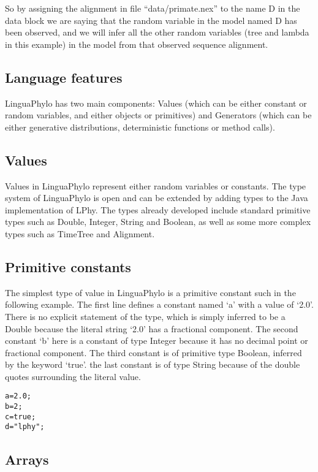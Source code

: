 \documentclass[10pt,letterpaper,table]{article}
\begin{document}
So by assigning the alignment in file
``data/primate.nex'' to the name D in the data block we are saying that the random variable in the model named D has
been observed, and we will infer all the other random variables
(tree and lambda in this example) in the model from that observed sequence alignment.

\subsection*{Language features}

LinguaPhylo has two main components: Values (which can be either constant or random variables, and either objects or primitives) and Generators (which can be either generative distributions, deterministic functions or method calls).

\subsection*{Values}

Values in LinguaPhylo represent either random variables or constants. The type system of LinguaPhylo is open and can be extended by adding types to the Java implementation of LPhy. The types already developed include standard primitive types such as Double, Integer, String and Boolean, as well as some more complex types such as TimeTree and Alignment.

\subsection*{Primitive constants}

The simplest type of value in LinguaPhylo is a primitive constant such in the following example. The first line defines a constant named `a' with a value of `2.0'. There is no explicit statement of the type, which is simply inferred to be a Double because the literal string `2.0' has a fractional component. The second constant `b' here is a constant of type Integer because it has no decimal point or fractional component. The third constant is of primitive type Boolean, inferred by the keyword `true'. the last constant is of type String because of the double quotes surrounding the literal value.

{\singlespacing
\begin{alltt}
  a = 2.0;
  b = 2;
  c = true;
  d = "lphy";
\end{alltt}
}

\subsection*{Arrays}
\end{document}

